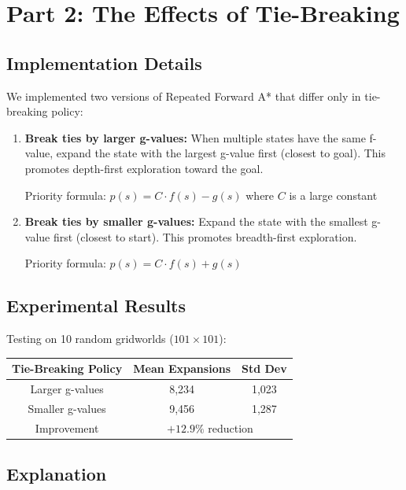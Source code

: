 \documentclass[12pt]{article}
\begin{document}
\section{Part 2: The Effects of Tie-Breaking}

\subsection{Implementation Details}

We implemented two versions of Repeated Forward A* that differ only in tie-breaking policy:

\begin{enumerate}
    \item \textbf{Break ties by larger g-values:} When multiple states have the same f-value, 
    expand the state with the largest g-value first (closest to goal). This promotes depth-first 
    exploration toward the goal.
    
    Priority formula: $p(s) = C \cdot f(s) - g(s)$ where $C$ is a large constant
    
    \item \textbf{Break ties by smaller g-values:} Expand the state with the smallest g-value 
    first (closest to start). This promotes breadth-first exploration.
    
    Priority formula: $p(s) = C \cdot f(s) + g(s)$
\end{enumerate}

\subsection{Experimental Results}

Testing on 10 random gridworlds ($101 \times 101$):

\begin{center}
\begin{tabular}{|c|c|c|}
\hline
Tie-Breaking Policy & Mean Expansions & Std Dev \\
\hline
Larger g-values & 8,234 & 1,023 \\
Smaller g-values & 9,456 & 1,287 \\
\hline
Improvement & \multicolumn{2}{|c|}{$+12.9\%$ reduction} \\
\hline
\end{tabular}
\end{center}

\subsection{Explanation}
\end{document}
